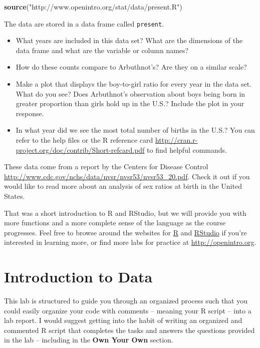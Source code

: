 \documentclass[]{book}
\newenvironment{Shaded}{\begin{snugshade}}{\end{snugshade}}
\newcommand{\KeywordTok}[1]{\textcolor[rgb]{0.13,0.29,0.53}{\textbf{#1}}}
\newcommand{\NormalTok}[1]{#1}
\newcommand{\StringTok}[1]{\textcolor[rgb]{0.31,0.60,0.02}{#1}}
\theoremstyle{definition}
\theoremstyle{definition}
\theoremstyle{definition}
\theoremstyle{remark}
\begin{document}
\begin{Shaded}
\begin{Highlighting}[]
\KeywordTok{source}\NormalTok{(}\StringTok{"http://www.openintro.org/stat/data/present.R"}\NormalTok{)}
\end{Highlighting}
\end{Shaded}

The data are stored in a data frame called \texttt{present}.

\begin{itemize}
\item
  What years are included in this data set? What are the dimensions of
  the data frame and what are the variable or column names?
\item
  How do these counts compare to Arbuthnot's? Are they on a similar
  scale?
\item
  Make a plot that displays the boy-to-girl ratio for every year in the
  data set. What do you see? Does Arbuthnot's observation about boys
  being born in greater proportion than girls hold up in the U.S.?
  Include the plot in your response.
\item
  In what year did we see the most total number of births in the U.S.?
  You can refer to the help files or the R reference card
  \url{http://cran.r-project.org/doc/contrib/Short-refcard.pdf} to find
  helpful commands.
\end{itemize}

These data come from a report by the Centers for Disease Control
\url{http://www.cdc.gov/nchs/data/nvsr/nvsr53/nvsr53_20.pdf}. Check it
out if you would like to read more about an analysis of sex ratios at
birth in the United States.

That was a short introduction to R and RStudio, but we will provide you
with more functions and a more complete sense of the language as the
course progresses. Feel free to browse around the websites for
\href{http://www.r-project.org}{R} and
\href{http://rstudio.org}{RStudio} if you're interested in learning
more, or find more labs for practice at \url{http://openintro.org}.

\hypertarget{introduction-to-data}{%
\chapter{Introduction to Data}\label{introduction-to-data}}

This lab is structured to guide you through an organized process such
that you could easily organize your code with comments -- meaning your R
script -- into a lab report. I would suggest getting into the habit of
writing an organized and commented R script that completes the tasks and
answers the questions provided in the lab -- including in the
\textbf{Own Your Own} section.
\end{document}
